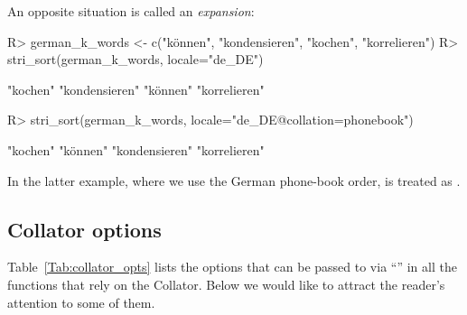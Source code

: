 \documentclass[nojss]{jss}
\begin{document}
An opposite situation is called an \textit{expansion}:
\begin{Schunk}
\begin{Sinput}
R> german_k_words <- c("können", "kondensieren", "kochen", "korrelieren")
R> stri_sort(german_k_words, locale="de_DE")
\end{Sinput}
\begin{Soutput}
[1] "kochen"       "kondensieren" "können"       "korrelieren"
\end{Soutput}
\begin{Sinput}
R> stri_sort(german_k_words, locale="de_DE@collation=phonebook")
\end{Sinput}
\begin{Soutput}
[1] "kochen"       "können"       "kondensieren" "korrelieren"
\end{Soutput}
\end{Schunk}

In the latter example, where we use the German phone-book order,
 is treated as .



%
%
%
%
%



\subsection{Collator options}\label{Sec:collator_opts}

Table~\ref{Tab:collator_opts} lists the options
that can be passed to  via ``'' in
all the functions that rely on the  Collator.
Below we would like to attract the reader's attention
to some of them.

\end{document}
